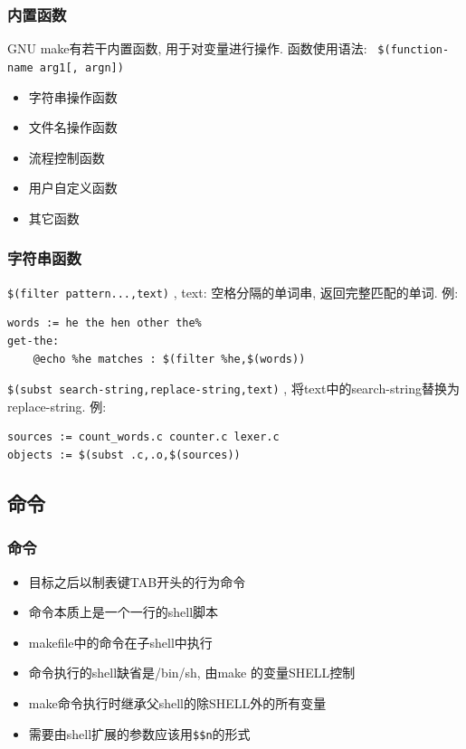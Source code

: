 \documentclass[compress]{beamer}
\begin{document}
\begin{frame}[containsverbatim]
\frametitle{内置函数}
GNU make有若干内置函数, 用于对变量进行操作.
函数使用语法: \verb~ $(function-name arg1[, argn])~
\begin{itemize}
\item 字符串操作函数
\item 文件名操作函数
\item 流程控制函数
\item 用户自定义函数
\item 其它函数
\end{itemize}
\end{frame}

\begin{frame}[containsverbatim]
\frametitle{字符串函数}
\verb~$(filter pattern...,text)~ , text: 空格分隔的单词串, 
  返回完整匹配的单词. 例:\\
{\small
\begin{Verbatim}[showtabs=true]
words := he the hen other the%
get-the:
	@echo %he matches : $(filter %he,$(words))
\end{Verbatim}
}

\verb~$(subst search-string,replace-string,text)~ , 将text中的search-string替换为replace-string. 例:\\
{\small
\begin{Verbatim}
sources := count_words.c counter.c lexer.c
objects := $(subst .c,.o,$(sources))
\end{Verbatim}
}
\end{frame}

\subsection{命令}

\begin{frame}[containsverbatim]
\frametitle{命令}

\begin{itemize}
\item 目标之后以制表键TAB开头的行为命令
\item 命令本质上是一个一行的shell脚本
\item makefile中的命令在子shell中执行
\item 命令执行的shell缺省是/bin/sh, 由make 的变量SHELL控制
\item make命令执行时继承父shell的除SHELL外的所有变量
\item 需要由shell扩展的参数应该用\verb~$$n~的形式
\end{itemize}
\end{frame}
\end{document}
